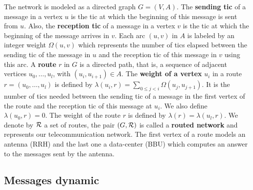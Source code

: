 \documentclass[10pt]{article}
\newcommand{\todo}[1]{{\color{red} TODO: {#1}}}
\begin{document}
The network is modeled as a directed graph $G=(V,A)$. The \textbf{sending tic} of a message in a vertex $u$ is the tic at which the beginning of this message is sent from $u$. Also, the \textbf{reception tic} of a message in a vertex $v$ is the tic at which the beginning of the message arrives in $v$.  Each arc  $(u,v)$ in $A$ is labeled by an integer weight $\Omega(u,v)$ which represents the number of tics elapsed between the sending tic of the message in $u$ and the reception tic of this message in $v$ using this arc. A {\bf route} $r$ in $G$ is a directed path, that is, a sequence of adjacent vertices $u_0, \ldots , u_{l}$, with $(u_i,u_{i+1}) \in A$.  The {\bf weight of a vertex} $u_i$ in a route $r=(u_0,\dots,u_l)$ is defined by $\lambda(u_i,r)= \sum\limits_{0 \leq j <i} \Omega(u_j, u_{j+1})$. It is the number of tics needed between the sending tic of a message in the first vertex of the route and the reception tic of this message at $u_i$. We also define $\lambda(u_0,r)=0$. The weight of the route $r$ is defined by $\lambda (r)= \lambda (u_l,r)$.
We denote by $\cal R$ a set of routes, the pair $(G,\cal R)$ is called a {\bf routed network} and represents our telecommunication network.
The first vertex of a route models an antenna (RRH) and the last one a data-center (BBU) which computes an answer to the messages sent by the antenna.

   \subsection{Messages dynamic}
	 
    
\end{document}
